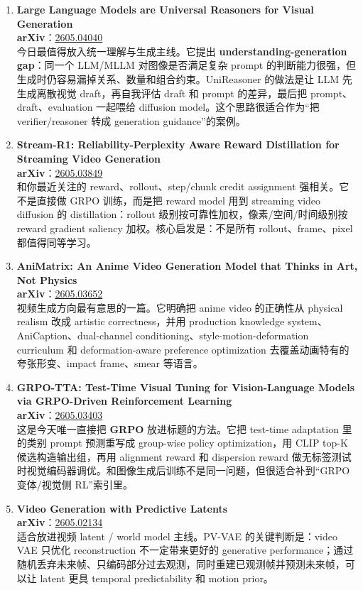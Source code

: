\begin{enumerate}[leftmargin=1.5em]
  \item \textbf{Large Language Models are Universal Reasoners for Visual Generation}\\
  \textbf{arXiv}：\href{https://arxiv.org/abs/2605.04040}{2605.04040}\\
  今日最值得放入统一理解与生成主线。它提出 \textbf{understanding-generation gap}：同一个 LLM/MLLM 对图像是否满足复杂 prompt 的判断能力很强，但生成时仍容易漏掉关系、数量和组合约束。UniReasoner 的做法是让 LLM 先生成离散视觉 draft，再自我评估 draft 和 prompt 的差异，最后把 prompt、draft、evaluation 一起喂给 diffusion model。这个思路很适合作为“把 verifier/reasoner 转成 generation guidance”的案例。

  \item \textbf{Stream-R1: Reliability-Perplexity Aware Reward Distillation for Streaming Video Generation}\\
  \textbf{arXiv}：\href{https://arxiv.org/abs/2605.03849}{2605.03849}\\
  和你最近关注的 reward、rollout、step/chunk credit assignment 强相关。它不是直接做 GRPO 训练，而是把 reward model 用到 streaming video diffusion 的 distillation：rollout 级别按可靠性加权，像素/空间/时间级别按 reward gradient saliency 加权。核心启发是：不是所有 rollout、frame、pixel 都值得同等学习。

  \item \textbf{AniMatrix: An Anime Video Generation Model that Thinks in Art, Not Physics}\\
  \textbf{arXiv}：\href{https://arxiv.org/abs/2605.03652}{2605.03652}\\
  视频生成方向最有意思的一篇。它明确把 anime video 的正确性从 physical realism 改成 artistic correctness，并用 production knowledge system、AniCaption、dual-channel conditioning、style-motion-deformation curriculum 和 deformation-aware preference optimization 去覆盖动画特有的夸张形变、impact frame、smear 等语言。

  \item \textbf{GRPO-TTA: Test-Time Visual Tuning for Vision-Language Models via GRPO-Driven Reinforcement Learning}\\
  \textbf{arXiv}：\href{https://arxiv.org/abs/2605.03403}{2605.03403}\\
  这是今天唯一直接把 \textbf{GRPO} 放进标题的方法。它把 test-time adaptation 里的类别 prompt 预测重写成 group-wise policy optimization，用 CLIP top-K 候选构造输出组，再用 alignment reward 和 dispersion reward 做无标签测试时视觉编码器调优。和图像生成后训练不是同一问题，但很适合补到“GRPO 变体/视觉侧 RL”索引里。

  \item \textbf{Video Generation with Predictive Latents}\\
  \textbf{arXiv}：\href{https://arxiv.org/abs/2605.02134}{2605.02134}\\
  适合放进视频 latent / world model 主线。PV-VAE 的关键判断是：video VAE 只优化 reconstruction 不一定带来更好的 generative performance；通过随机丢弃未来帧、只编码部分过去观测，同时重建已观测帧并预测未来帧，可以让 latent 更具 temporal predictability 和 motion prior。
\end{enumerate}

